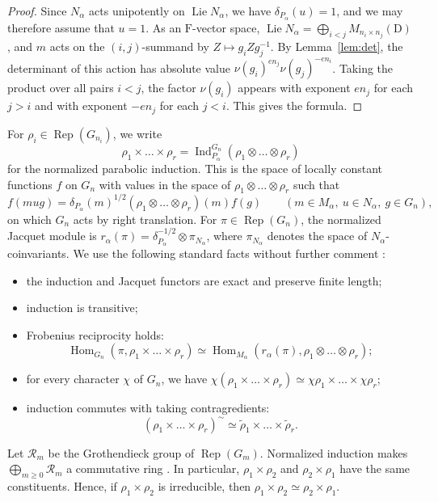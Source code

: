 \documentclass[11pt]{amsart}
\numberwithin{equation}{section}
\theoremstyle{plain}
\theoremstyle{definition}
\theoremstyle{remark}
\DeclareMathOperator{\Hom}{Hom}
\DeclareMathOperator{\Rep}{Rep}
\DeclareMathOperator{\Ind}{Ind}
\DeclareMathOperator{\Lie}{Lie}
\begin{document}
\begin{proof}
	Since $N_\alpha$ acts unipotently on $\Lie N_\alpha$, we have $\delta_{P_\alpha}(u)=1$, and we may therefore assume that $u=1$. As an $\mathrm{F}$-vector space, $\Lie N_\alpha=\bigoplus_{i<j}M_{n_i\times n_j}(\mathrm{D})$, and $m$ acts on the $(i,j)$-summand by $Z\mapsto g_iZg_j^{-1}$. By Lemma~\ref{lem:det}, the determinant of this action has absolute value $\nu(g_i)^{en_j}\nu(g_j)^{-en_i}$. Taking the product over all pairs $i<j$, the factor $\nu(g_i)$ appears with exponent $en_j$ for each $j>i$ and with exponent $-en_j$ for each $j<i$. This gives the formula.
\end{proof}

For $\rho_i\in\Rep(G_{n_i})$, we write
$$
\rho_1\times\dots\times\rho_r=\Ind_{P_\alpha}^{G_n}(\rho_1\otimes\dots\otimes\rho_r)
$$
for the normalized parabolic induction. This is the space of locally constant functions $f$ on $G_n$ with values in the space of $\rho_1\otimes\dots\otimes\rho_r$ such that
$$
f(mug)=\delta_{P_\alpha}(m)^{1/2}(\rho_1\otimes\dots\otimes\rho_r)(m)f(g)\qquad(m\in M_\alpha,\ u\in N_\alpha,\ g\in G_n),
$$
on which $G_n$ acts by right translation. For $\pi\in\Rep(G_n)$, the normalized Jacquet module is $r_\alpha(\pi)=\delta_{P_\alpha}^{-1/2}\otimes\pi_{N_\alpha}$, where $\pi_{N_\alpha}$ denotes the space of $N_\alpha$-coinvariants. We use the following standard facts without further comment \cite{BZ77,Tad90}:
\begin{itemize}
	\item the induction and Jacquet functors are exact and preserve finite length;
	\item induction is transitive;
	\item Frobenius reciprocity holds:
	$$
	\Hom_{G_n}(\pi,\rho_1\times\dots\times\rho_r)\simeq\Hom_{M_\alpha}(r_\alpha(\pi),\rho_1\otimes\dots\otimes\rho_r);
	$$
	\item for every character $\chi$ of $G_n$, we have $\chi(\rho_1\times\dots\times\rho_r)\simeq\chi\rho_1\times\dots\times\chi\rho_r$;
	\item induction commutes with taking contragredients:
	\begin{equation}\label{eq:contragredient}
		(\rho_1\times\dots\times\rho_r)^\sim\simeq\widetilde\rho_1\times\dots\times\widetilde\rho_r .
	\end{equation}
\end{itemize}
Let $\mathcal{R}_m$ be the Grothendieck group of $\Rep(G_m)$. Normalized induction makes $\bigoplus_{m\ge0}\mathcal R_m$ a commutative ring \cite{Tad90}. In particular, $\rho_1\times\rho_2$ and $\rho_2\times\rho_1$ have the same constituents. Hence, if $\rho_1\times\rho_2$ is irreducible, then $\rho_1\times\rho_2\simeq\rho_2\times\rho_1$.
\end{document}
